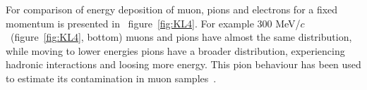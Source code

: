 For comparison of energy deposition of muon, pions and electrons for a fixed momentum is presented in ~figure~\ref{fig:KL4}. 
For example 300 MeV/$c$~(figure~\ref{fig:KL4}, bottom) muons and pions have almost the same distribution, while moving to lower energies pions have a broader distribution, experiencing hadronic interactions and loosing more energy.
This pion behaviour has been used to estimate its contamination in muon samples~\cite{2016JInst..11P3001A}. 


